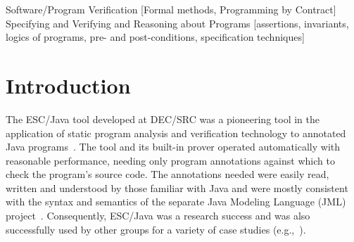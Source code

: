 \documentclass{acm_proc_article-sp}
\newif\ifpdf
\begin{document}
\newcommand{\myhref}[2]{\ifpdf\href{#1}{#2}\else\htmladdnormallinkfoot{#2}{#1}\fi}

\maketitle
\begin{abstract}
The ESC/Java tool was a useful advance in effective static checking of realistic Java programs,
but had become somewhat out of date with respect to Java and the Java Modeling Language (JML).
The ESC/Java2 project, whose progress is described in this paper, builds on ESC/Java to parse
all of JML, to increase the amount of static checking performed, and to make the tool widely
available.  It is intended that ESC/Java2 be used for further research in annotation and verification, for larger-scale case studies of annotation and verification, and for studies in programmer productivity that may result from integration with other tools that work with JML.
\end{abstract}

                {Software/Program Verification}
                [Formal methods, Programming by Contract]
                {Specifying and Verifying and Reasoning about Programs}
                [assertions, invariants, logics of programs,
                pre- and post-conditions, specification techniques]




\section{Introduction}

The ESC/Java tool developed at DEC/SRC was a pioneering tool in the
application of static program analysis and verification technology to
annotated Java programs~\cite{ESCJava}.  The tool and its built-in
prover operated automatically with reasonable performance, needing
only program annotations against which to check the program's source
code.  The annotations needed were easily read, written and understood
by those familiar with Java and were mostly consistent with the syntax
and semantics of the separate Java Modeling Language (JML)
project~\cite{Leavens-etal00,jmlpapers}.  Consequently, ESC/Java was a
research success and was also successfully used by other groups for a
variety of case studies (e.g.,~\cite{Hub03,HOP04}).
\end{document}
